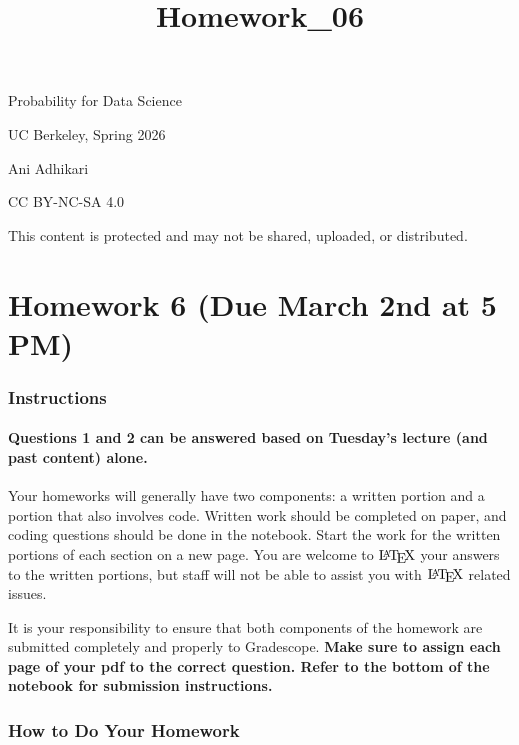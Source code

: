 \documentclass[11pt]{article}
\title{Homework\_06}
\let\Oldlatex\LaTeX
\renewcommand{\LaTeX}{\textrm{\Oldlatex}}
\begin{document}
    
    \maketitle
    
    

    
    Probability for Data Science

UC Berkeley, Spring 2026

Ani Adhikari

CC BY-NC-SA 4.0

This content is protected and may not be shared, uploaded, or
distributed.

    \section{Homework 6 (Due March 2nd at 5
PM)}\label{homework-6-due-march-2nd-at-5-pm}

    \subsubsection{Instructions}\label{instructions}

\paragraph{\texorpdfstring{\textbf{Questions 1 and 2 can be answered
based on Tuesday's lecture (and past content)
alone.}}{Questions 1 and 2 can be answered based on Tuesday's lecture (and past content) alone.}}\label{questions-1-and-2-can-be-answered-based-on-tuesdays-lecture-and-past-content-alone.}

Your homeworks will generally have two components: a written portion and
a portion that also involves code. Written work should be completed on
paper, and coding questions should be done in the notebook. Start the
work for the written portions of each section on a new page. You are
welcome to \(\LaTeX\) your answers to the written portions, but staff
will not be able to assist you with \(\LaTeX\) related issues.

It is your responsibility to ensure that both components of the homework
are submitted completely and properly to Gradescope. \textbf{Make sure
to assign each page of your pdf to the correct question. Refer to the
bottom of the notebook for submission instructions.}

    \subsubsection{How to Do Your Homework}\label{how-to-do-your-homework}
\end{document}
